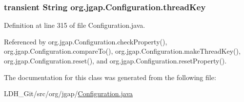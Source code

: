 \hypertarget{classorg_1_1jgap_1_1_configuration_a4057fbe057ac78353d7ad87db1f816d5}{
\subsubsection[{thread\-Key}]{\setlength{\rightskip}{0pt plus 5cm}transient String org.\-jgap.\-Configuration.\-thread\-Key\hspace{0.3cm}{\ttfamily [private]}}}\label{classorg_1_1jgap_1_1_configuration_a4057fbe057ac78353d7ad87db1f816d5}


Definition at line 315 of file Configuration.\-java.



Referenced by org.\-jgap.\-Configuration.\-check\-Property(), org.\-jgap.\-Configuration.\-compare\-To(), org.\-jgap.\-Configuration.\-make\-Thread\-Key(), org.\-jgap.\-Configuration.\-reset(), and org.\-jgap.\-Configuration.\-reset\-Property().



The documentation for this class was generated from the following file\-:\begin{DoxyCompactItemize}
\item 
L\-D\-H\-\_\-\-Git/src/org/jgap/\hyperlink{_configuration_8java}{Configuration.\-java}\end{DoxyCompactItemize}
